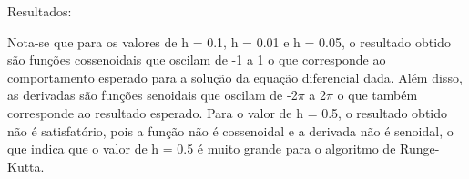 \documentclass[12pt, a4paper]{article} %
\begin{document}
        Resultados:

        Nota-se que para os valores de h = 0.1, h = 0.01 e h = 0.05, o resultado obtido s\~ao fun\c{c}\~oes cossenoidais que oscilam de -1 a 1 o que corresponde ao comportamento esperado para a solu\c{c}\~ao da equa\c{c}\~ao diferencial dada. Al\'em disso, as derivadas s\~ao fun\c{c}\~oes senoidais que oscilam de -2$\pi$ a 2$\pi$ o que tamb\'em corresponde ao resultado esperado. Para o valor de h = 0.5, o resultado obtido n\~ao \'e satisfat\'orio, pois a fun\c{c}\~ao n\~ao \'e cossenoidal e a derivada n\~ao \'e senoidal, o que indica que o valor de h = 0.5 \'e muito grande para o algoritmo de Runge-Kutta.
\end{document}
